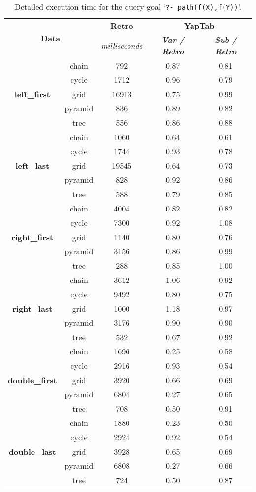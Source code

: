 \begin{table}[ht]
\centering
\footnotesize{
  \begin{tabular}{cc|c|cc}
   \hline
    \hline
    \multicolumn{2}{c|}{\multirow{2}{*}{\small{\textbf{Data}}}} & \textbf{\small{Retro}} & \multicolumn{2}{c}{\small{\textbf{YapTab}}} \\
     \multicolumn{2}{c|}{} & \scriptsize{\textit{milliseconds}} & \textbf{\textit{\scriptsize{Var / Retro}}} & \textbf{\textit{\scriptsize{Sub / Retro}}} \\
   \hline
   \hline

\multirow{5}{*}{\textbf{left\_first}} &  chain &  792 &  0.87 & 0.81 \\
&  cycle &  1712 &  0.96 & 0.79 \\
&  grid &  16913 &  0.75 & 0.99 \\
&  pyramid &  836 &  0.89 & 0.82 \\
&  tree &  556 &  0.86 & 0.88 \\
\hline
\multirow{5}{*}{\textbf{left\_last}} &  chain &  1060 &  0.64 & 0.61 \\
&  cycle &  1744 &  0.93 & 0.78 \\
&  grid &  19545 &  0.64 & 0.73 \\
&  pyramid &  828 &  0.92 & 0.86 \\
&  tree &  588 &  0.79 & 0.85 \\
\hline
\multirow{5}{*}{\textbf{right\_first}} &  chain &  4004 &  0.82 & 0.82 \\
&  cycle &  7300 &  0.92 & 1.08 \\
&  grid &  1140 &  0.80 & 0.76 \\
&  pyramid &  3156 &  0.86 & 0.99 \\
&  tree &  288 &  0.85 & 1.00 \\
\hline
\multirow{5}{*}{\textbf{right\_last}} &  chain &  3612 &  1.06 & 0.92 \\
&  cycle &  9492 &  0.80 & 0.75 \\
&  grid &  1000 &  1.18 & 0.97 \\
&  pyramid &  3176 &  0.90 & 0.90 \\
&  tree &  532 &  0.67 & 0.92 \\
\hline

\multirow{5}{*}{\textbf{double\_first}} &  chain &  1696 &  0.25 & 0.58 \\
&  cycle &  2916 &  0.93 & 0.54 \\
&  grid &  3920 &  0.66 & 0.69 \\
&  pyramid &  6804 &  0.27 & 0.65 \\
&  tree &  708 &  0.50 & 0.91 \\
\hline
\multirow{5}{*}{\textbf{double\_last}} &  chain &  1880 &  0.23 & 0.50 \\
&  cycle &  2924 &  0.92 & 0.54 \\
&  grid &  3928 &  0.65 & 0.69 \\
&  pyramid &  6808 &  0.27 & 0.66 \\
&  tree &  724 &  0.50 & 0.87 \\
\hline
\hline
\end{tabular}
}
\caption{Detailed execution time for the query goal `\texttt{?-~path(f(X),f(Y))}'.}
\label{tbl:results_detail_stst}
\end{table}